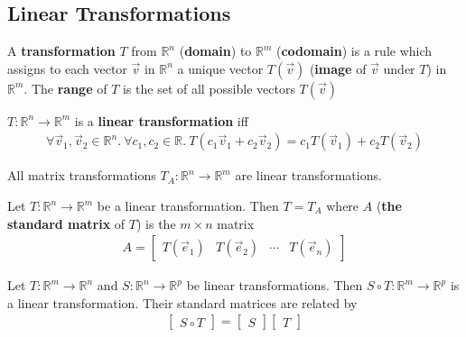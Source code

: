 \documentclass{article}
\begin{document}
\subsection{Linear Transformations}
\begin{definition}
    A \textbf{transformation} $T$ from $\mathbb{R}^n$ (\textbf{domain}) to $\mathbb{R}^m$ (\textbf{codomain}) is a rule which assigns to each vector $\vec v$ in $\mathbb{R}^n$ a unique vector $T(\vec v)$ (\textbf{image} of $\vec v$ under $T$) in $\mathbb{R}^m$.
    The \textbf{range} of $T$ is the set of all possible vectors $T(\vec v)$
\end{definition}
\begin{definition}
    $T:\mathbb{R}^n \to \mathbb{R}^m$ is a \textbf{linear transformation} iff
    \begin{align*}
        \forall \vec v_1, \vec v_2 \in \mathbb{R}^n.\:\forall c_1, c_2 \in \mathbb{R}.\: T(c_1\vec v_1 + c_2\vec v_2) = c_1T(\vec v_1) + c_2T(\vec v_2)
    \end{align*}
\end{definition}
\begin{theorem}
    All matrix transformations $T_A:\mathbb{R}^n\to\mathbb{R}^m$ are linear transformations.
\end{theorem}
\begin{theorem}
    Let $T:\mathbb{R}^n\to\mathbb{R}^m$ be a linear transformation. Then $T=T_A$ where $A$ (\textbf{the standard matrix} of $T$) is the $m\times n$ matrix
    \begin{align*}
        A = \begin{bmatrix}
            T(\vec e_1) & T(\vec e_2) & \cdots & T(\vec e_n)
        \end{bmatrix}
    \end{align*}
\end{theorem}
\begin{theorem}
    Let $T:\mathbb{R}^m\to\mathbb{R}^n$ and $S:\mathbb{R}^n\to\mathbb{R}^p$ be linear transformations. Then $S\circ T:\mathbb{R}^m\to\mathbb{R}^p$ is a linear transformation. Their standard matrices are related by
    \begin{align*}
        \begin{bmatrix}
            S\circ T
        \end{bmatrix}
        = \begin{bmatrix}
            S
        \end{bmatrix}
        \begin{bmatrix}
            T
        \end{bmatrix}
    \end{align*}
\end{theorem}
\end{document}
